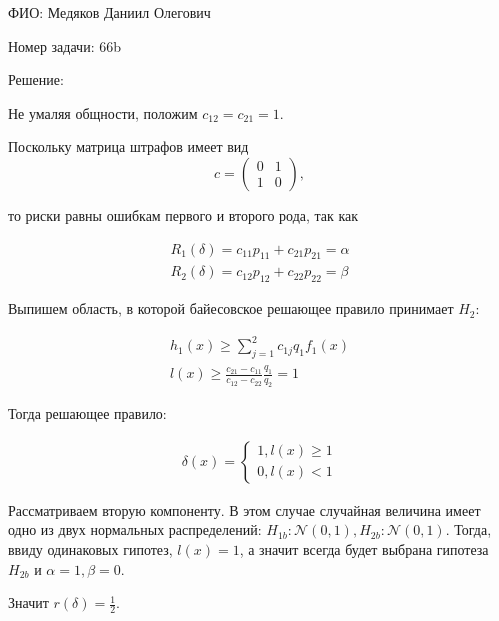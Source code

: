 \documentclass[14pt]{extarticle}
\begin{document}
ФИО: Медяков Даниил Олегович

\vspace{10pt}

Номер задачи: 66b

\vspace{10pt}

Решение:

\vspace{10pt}

Не умаляя общности, положим $c_{12} = c_{21} = 1$.

Поскольку матрица штрафов имеет вид 
\begin{equation*}
    c = 
    \begin{pmatrix}
      0& 1\\
      1& 0
    \end{pmatrix},
\end{equation*}

то риски равны ошибкам первого и второго рода, так как

\begin{gather*}
    R_1(\delta) = c_{11}p_{11} + c_{21}p_{21} = \alpha\\
    R_2(\delta) = c_{12}p_{12} + c_{22}p_{22} = \beta
\end{gather*}

Выпишем область, в которой байесовское решающее правило принимает $H_2$:

\begin{gather*}
    h_1(x) \geqslant \sum\limits_{j=1}^2 c_{1j}q_1f_1(x)\\
    l(x) \geqslant \frac{c_{21} - c_{11}}{c_{12} - c_{22}}\frac{q_1}{q_2} = 1
\end{gather*}

Тогда решающее правило:

\begin{gather*}
    \delta(x)=
    \begin{cases}
        1, l(x) \geqslant 1\\
        0, l(x) < 1
    \end{cases}
\end{gather*}

Рассматриваем вторую компоненту. В этом случае случайная величина имеет одно из двух нормальных распределений: $H_{1b}: \mathcal{N}(0, 1), H_{2b}: \mathcal{N}(0, 1)$. Тогда, ввиду одинаковых гипотез, $l(x) = 1$, а значит всегда будет выбрана гипотеза $H_{2b}$ и $\alpha = 1, \beta = 0$. 

    Значит $r(\delta) = \frac{1}{2}$.
\end{document}
